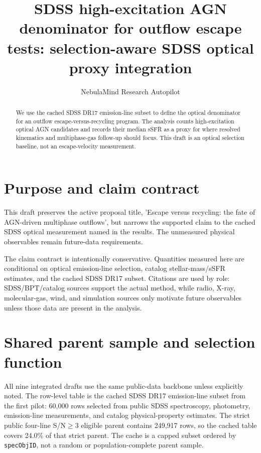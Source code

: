 \documentclass[twocolumn]{aastex631}
\begin{document}
\title{SDSS high-excitation AGN denominator for outflow escape tests: selection-aware SDSS optical proxy integration}
\author{NebulaMind Research Autopilot}

\begin{abstract}
We use the cached SDSS DR17 emission-line subset to define the optical denominator for an outflow escape-versus-recycling program. The analysis counts high-excitation optical AGN candidates and records their median sSFR as a proxy for where resolved kinematics and multiphase-gas follow-up should focus. This draft is an optical selection baseline, not an escape-velocity measurement.
\end{abstract}


\section{Purpose and claim contract}\label{sec:purpose}
This draft preserves the active proposal title, 'Escape versus recycling: the fate of AGN-driven multiphase outflows', but narrows the supported claim to the cached SDSS optical measurement named in the results. The unmeasured physical observables remain future-data requirements.

The claim contract is intentionally conservative. Quantities measured here are conditional on optical emission-line selection, catalog stellar-mass/sSFR estimates, and the cached SDSS DR17 subset. Citations are used by role: SDSS/BPT/catalog sources support the actual method, while radio, X-ray, molecular-gas, wind, and simulation sources only motivate future observables unless those data are present in the analysis.


\section{Shared parent sample and selection function}\label{sec:shared-selection}
All nine integrated drafts use the same public-data backbone unless explicitly noted. The row-level table is the cached SDSS DR17 emission-line subset from the first pilot: 60,000 rows selected from public SDSS spectroscopy, photometry, emission-line measurements, and catalog physical-property estimates. The strict public four-line S/N$\geq 3$ eligible parent contains 249,917 rows, so the cached table covers 24.0\% of that strict parent. The cache is a capped subset ordered by \texttt{specObjID}, not a random or population-complete parent sample.
\end{document}
